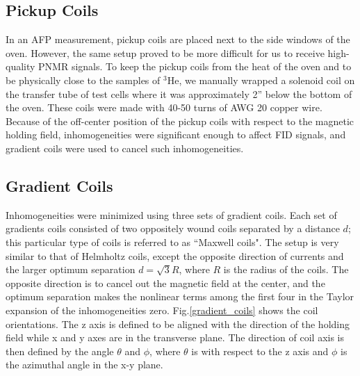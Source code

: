 \subsection{Pickup Coils}

In an AFP measurement, pickup coils are placed next to the side windows of the oven. However, the same setup proved to be more difficult for us to receive high-quality PNMR signals. To keep the pickup coils from the heat of the oven and to be physically close to the samples of $^3$He, we manually wrapped a solenoid coil on the transfer tube of test cells where it was approximately 2'' below the bottom of the oven. These coils were made with 40-50 turns of AWG 20 copper wire. Because of the off-center position of the pickup coils with respect to the magnetic holding field, inhomogeneities were significant enough to affect FID signals, and gradient coils were used to cancel such inhomogeneities.

\subsection{Gradient Coils}

Inhomogeneities were minimized using three sets of gradient coils. Each set of gradients coils consisted of two oppositely wound coils separated by a distance $d$; this particular type of coils is referred to as ``Maxwell coils". The setup is very similar to that of Helmholtz coils, except the opposite direction of currents and the larger optimum separation $d=\sqrt{3}R$, where $R$ is the radius of the coils. The opposite direction is to cancel out the magnetic field at the center, and the optimum separation makes the nonlinear terms among the first four in the Taylor expansion of the inhomogeneities zero\cite{Callaghan}. Fig.\ref{gradient_coils} shows the coil orientations. The z axis is defined to be aligned with the direction of the holding field while x and y axes are in the transverse plane. The direction of coil axis is then defined by the angle $\theta$ and $\phi$, where $\theta$ is with respect to the z axis and $\phi$ is the azimuthal angle in the x-y plane.

